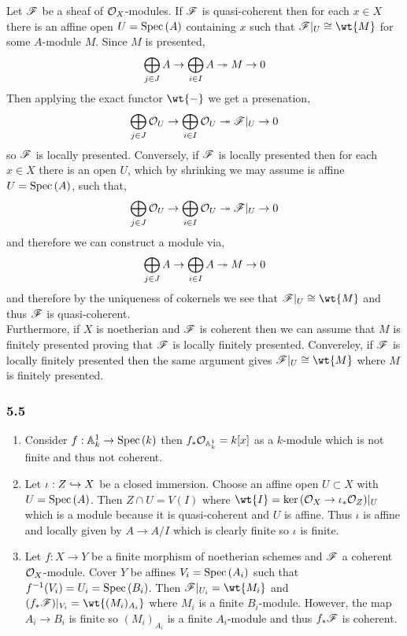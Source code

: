 \documentclass[12pt]{article}
\begin{document}
Let $\mathscr{F}$ be a sheaf of $\mathcal{O}_{X}$-modules. If $\mathscr{F}$ is quasi-coherent then for each $x \in X$ there is an affine open $U = \mathrm{Spec}\left( A \right)$ containing $x$ such that $\F|_U \cong \wt{M}$ for some $A$-module $M$. Since $M$ is presented,
\[ \bigoplus_{j \in J} A \to \bigoplus_{i \in I} A \twoheadrightarrow M \to 0 \]
Then applying the exact functor $\wt{-}$ we get a presenation,
\[ \bigoplus_{j \in J} \mathcal{O}_{U} \to \bigoplus_{i \in I} \mathcal{O}_{U} \twoheadrightarrow \mathscr{F}|_U \to 0 \]
so $\mathscr{F}$ is locally presented. Conversely, if $\mathscr{F}$ is locally presented then for each $x \in X$ there is an open $U$, which by shrinking we may assume is affine $U = \mathrm{Spec}\left( A \right)$, such that,
\[ \bigoplus_{j \in J} \mathcal{O}_{U} \to \bigoplus_{i \in I} \mathcal{O}_{U} \twoheadrightarrow \mathscr{F}|_U \to 0 \]
and therefore we can construct a module via,
\[ \bigoplus_{j \in J} A \to \bigoplus_{i \in I} A \twoheadrightarrow M \to 0 \]
and therefore by the uniqueness of cokernels we see that $\F|_U \cong \wt{M}$ and thus $\mathscr{F}$ is quasi-coherent.
\bigskip\\
Furthermore, if $X$ is noetherian and $\mathscr{F}$ is coherent then we can assume that $M$ is finitely presented proving that $\mathscr{F}$ is locally finitely presented. Convereley, if $\mathscr{F}$ is locally finitely presented then the same argument gives $\F|_U \cong \wt{M}$ where $M$ is finitely presented.

\subsubsection{5.5}

\begin{enumerate}
\item Consider $f : \mathbb{A}^1_k \to \mathrm{Spec}\left( k \right)$ then $f_* \mathcal{O}_{\mathbb{A}^1_k} = k[x]$ as a $k$-module which is not finite and thus not coherent.
\item Let $\iota : Z \hookrightarrow X$ be a closed immersion. Choose an affine open $U \subset X$ with $U = \mathrm{Spec}\left( A \right)$. Then $Z \cap U = V(I)$ where $\wt{I} = \ker{(\struct{X} \to \iota_* \struct{Z})}|_U$ which is a module because it is quasi-coherent and $U$ is affine. Thus $\iota$ is affine and locally given by $A \to A/I$ which is clearly finite so $\iota$ is finite.
\item Let $f : X \to Y$ be a finite morphism of noetherian schemes and $\mathscr{F}$ a coherent $\mathcal{O}_{X}$-module. Cover $Y$ be affines $V_i = \mathrm{Spec}\left( A_i \right)$ such that $f^{-1}(V_i) = U_i = \mathrm{Spec}\left( B_i \right)$. Then $\F|_{U_i} = \wt{M_i}$ and $(f_* \F)|_{V_i} = \wt{(M_i)_{A_i}}$ where $M_i$ is a finite $B_i$-module. However, the map $A_i \to B_i$ is finite so $(M_i)_{A_i}$ is a finite $A_i$-module and thus $f_* \mathscr{F}$ is coherent.
\end{enumerate}
\end{document}
